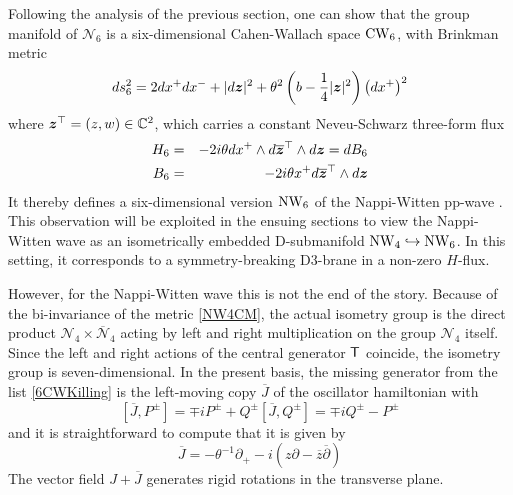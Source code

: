 Following the analysis of the previous section, one can show that the
group manifold of ${\mathcal N}_6$ is a six-dimensional Cahen-Wallach
space $\operatorname{CW}_6$, with Brinkman metric
\begin{equation}
  \label{NW6metricBrink}
  d s_6^2=2  d x^+  d x^-+| d{{\boldsymbol {z} }}|^2+\theta^2\left(b-\frac14
    |{{\boldsymbol {z} }}|^2\right)\left( d x^+\right)^2
\end{equation}
where ${{\boldsymbol {z} }}^\top=(z,w)\in{\mathbb C}^2$, which carries a constant Neveu-Schwarz
three-form flux
\begin{eqnarray}
  \nonumber H_6&=&-2 i \theta  d x^+\wedge d\overline{{{\boldsymbol {z} }}}^{ \top}
  \wedge d{{\boldsymbol {z} }}= d B_6\\\label{NW6Bfield}
  B_6&=&-2 i \theta x^+  d\overline{{{\boldsymbol {z} }}}^{ \top}\wedge d{{\boldsymbol {z} }}  
\end{eqnarray}
It thereby defines a six-dimensional version $\operatorname{NW}_6$ of the Nappi-Witten pp-wave
\cite{KM1}. This observation will be exploited in the ensuing sections to view
the Nappi-Witten wave as an isometrically embedded D-submanifold ${\rm
  NW}_4\hookrightarrow{\rm NW}_6$. In this setting, it corresponds to a
symmetry-breaking D3-brane in a non-zero $H$-flux.

However, for the Nappi-Witten wave this is not the end of the story. Because of
the bi-invariance of the metric \eqref{NW4CM}, the actual isometry group is the
direct product $\mathcal N_4\times\overline{\mathcal N}_4$ acting by left and
right multiplication on the group $\mathcal N_4$ itself. Since the left and
right actions of the central generator ${\sf T}$ coincide, the isometry group is
seven-dimensional. In the present basis, the missing generator from the list
\eqref{6CWKilling} is the left-moving copy $\overline{J}$ of the oscillator
hamiltonian with
\begin{equation}
  \label{JPpm}
  \left[ \overline{J} , P^\pm\right]=\mp i 
  P^\pm+ Q^{\pm}      \left[ \overline{J} , 
    Q^{\pm}\right]=\mp i  Q^{\pm}-P^\pm  
\end{equation}
and it is straightforward to compute that it is given by
\begin{equation}
  \label{extraHKilling}
  \overline{J}=-\theta^{-1} \partial_+- i \left(z \partial-\overline{z} 
    \overline{\partial} \right)  
\end{equation}
The vector field $J+\overline{J}$ generates rigid rotations in the transverse
plane.

